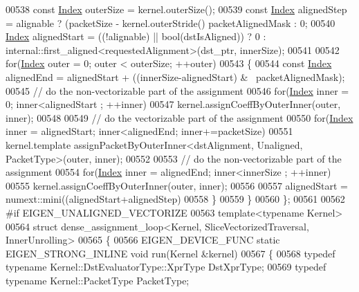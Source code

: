 \begin{DoxyCode}
00538     \textcolor{keyword}{const} \hyperlink{namespace_eigen_a62e77e0933482dafde8fe197d9a2cfde}{Index} outerSize = kernel.outerSize();
00539     \textcolor{keyword}{const} \hyperlink{namespace_eigen_a62e77e0933482dafde8fe197d9a2cfde}{Index} alignedStep = alignable ? (packetSize - kernel.outerStride() %
      packetAlignedMask : 0;
00540     \hyperlink{namespace_eigen_a62e77e0933482dafde8fe197d9a2cfde}{Index} alignedStart = ((!alignable) || \textcolor{keywordtype}{bool}(dstIsAligned)) ? 0 : 
      internal::first\_aligned<requestedAlignment>(dst\_ptr, innerSize);
00541 
00542     \textcolor{keywordflow}{for}(\hyperlink{namespace_eigen_a62e77e0933482dafde8fe197d9a2cfde}{Index} outer = 0; outer < outerSize; ++outer)
00543     \{
00544       \textcolor{keyword}{const} \hyperlink{namespace_eigen_a62e77e0933482dafde8fe197d9a2cfde}{Index} alignedEnd = alignedStart + ((innerSize-alignedStart) & ~packetAlignedMask);
00545       \textcolor{comment}{// do the non-vectorizable part of the assignment}
00546       \textcolor{keywordflow}{for}(\hyperlink{namespace_eigen_a62e77e0933482dafde8fe197d9a2cfde}{Index} inner = 0; inner<alignedStart ; ++inner)
00547         kernel.assignCoeffByOuterInner(outer, inner);
00548 
00549       \textcolor{comment}{// do the vectorizable part of the assignment}
00550       \textcolor{keywordflow}{for}(\hyperlink{namespace_eigen_a62e77e0933482dafde8fe197d9a2cfde}{Index} inner = alignedStart; inner<alignedEnd; inner+=packetSize)
00551         kernel.template assignPacketByOuterInner<dstAlignment, Unaligned, PacketType>(outer, inner);
00552 
00553       \textcolor{comment}{// do the non-vectorizable part of the assignment}
00554       \textcolor{keywordflow}{for}(\hyperlink{namespace_eigen_a62e77e0933482dafde8fe197d9a2cfde}{Index} inner = alignedEnd; inner<innerSize ; ++inner)
00555         kernel.assignCoeffByOuterInner(outer, inner);
00556 
00557       alignedStart = numext::mini((alignedStart+alignedStep)%
00558     \}
00559   \}
00560 \};
00561 
00562 \textcolor{preprocessor}{#if EIGEN\_UNALIGNED\_VECTORIZE}
00563 \textcolor{keyword}{template}<\textcolor{keyword}{typename} Kernel>
00564 \textcolor{keyword}{struct }dense\_assignment\_loop<Kernel, SliceVectorizedTraversal, InnerUnrolling>
00565 \{
00566   EIGEN\_DEVICE\_FUNC \textcolor{keyword}{static} EIGEN\_STRONG\_INLINE \textcolor{keywordtype}{void} run(Kernel &kernel)
00567   \{
00568     \textcolor{keyword}{typedef} \textcolor{keyword}{typename} Kernel::DstEvaluatorType::XprType DstXprType;
00569     \textcolor{keyword}{typedef} \textcolor{keyword}{typename} Kernel::PacketType PacketType;

\end{DoxyCode}
